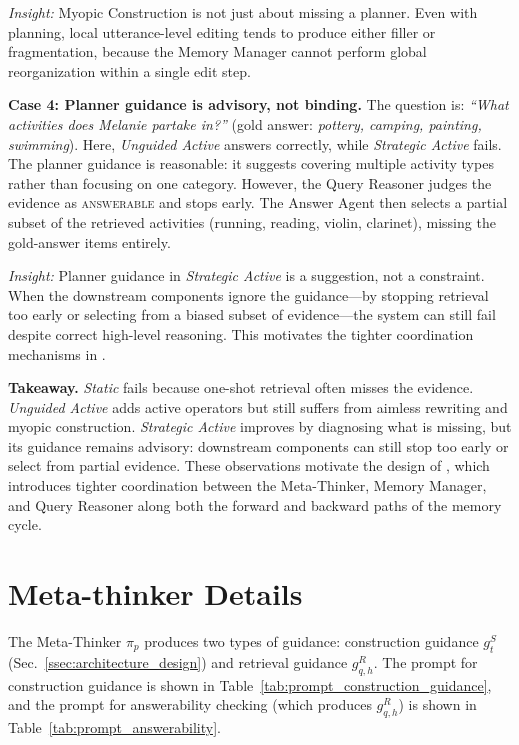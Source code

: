 \emph{Insight:} Myopic Construction is not just about missing a planner.
Even with planning, local utterance-level editing tends to produce either filler or fragmentation, because the Memory Manager cannot perform global reorganization within a single edit step.

\noindent\textbf{Case 4: Planner guidance is advisory, not binding.}
The question is: \emph{``What activities does Melanie partake in?''} (gold answer: \emph{pottery, camping, painting, swimming}).
Here, \textit{Unguided Active} answers correctly, while \textit{Strategic Active} fails.
The planner guidance is reasonable: it suggests covering multiple activity types rather than focusing on one category.
However, the Query Reasoner judges the evidence as \textsc{answerable} and stops early.
The Answer Agent then selects a partial subset of the retrieved activities (running, reading, violin, clarinet), missing the gold-answer items entirely.

\emph{Insight:} Planner guidance in \textit{Strategic Active} is a suggestion, not a constraint.
When the downstream components ignore the guidance---by stopping retrieval too early or selecting from a biased subset of evidence---the system can still fail despite correct high-level reasoning.
This motivates the tighter coordination mechanisms in \method.

\noindent\textbf{Takeaway.}
\textit{Static} fails because one-shot retrieval often misses the evidence.
\textit{Unguided Active} adds active operators but still suffers from aimless rewriting and myopic construction.
\textit{Strategic Active} improves by diagnosing what is missing, but its guidance remains advisory: downstream components can still stop too early or select from partial evidence.
These observations motivate the design of \method, which introduces tighter coordination between the Meta-Thinker, Memory Manager, and Query Reasoner along both the forward and backward paths of the memory cycle.


\section{Meta-thinker Details}
\label{appendix:meta_thinker_details}
The Meta-Thinker $\pi_p$ produces two types of guidance: construction guidance $g_t^S$ (Sec.~\ref{ssec:architecture_design}) and retrieval guidance $g_{q,h}^R$.
The prompt for construction guidance is shown in Table~\ref{tab:prompt_construction_guidance}, and the prompt for answerability checking (which produces $g_{q,h}^R$) is shown in Table~\ref{tab:prompt_answerability}.

